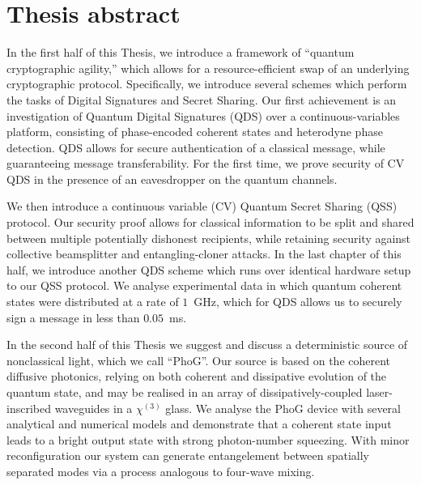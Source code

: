 \chapter*{\hfill Thesis abstract}

In the first half of this Thesis, we introduce a framework of ``quantum cryptographic agility,'' which allows for a resource-efficient swap of an underlying cryptographic protocol. Specifically, we introduce several schemes which perform the tasks of Digital Signatures and Secret Sharing. Our first achievement is an investigation of Quantum Digital Signatures (QDS) over a continuous-variables platform, consisting of phase-encoded coherent states and heterodyne phase detection. QDS allows for secure authentication of a classical message, while guaranteeing message transferability. For the first time, we prove security of CV QDS in the presence of an eavesdropper on the quantum channels. 

We then introduce a continuous variable (CV) Quantum Secret Sharing (QSS) protocol. Our security proof allows for classical information to be split and shared between multiple potentially dishonest recipients, while retaining security against collective beamsplitter and entangling-cloner attacks. In the last chapter of this half, we introduce another QDS scheme which runs over identical hardware setup to our QSS protocol. We analyse experimental data in which quantum coherent states were distributed at a rate of $1$~GHz, which for QDS allows us to securely sign a message in less than $0.05$~ms.

In the second half of this Thesis we suggest and discuss a deterministic source of nonclassical light, which we call ``PhoG''. Our source is based on the coherent diffusive photonics, relying on both coherent and dissipative evolution of the quantum state, and may be realised in an array of dissipatively-coupled laser-inscribed waveguides in a $\chi^{\left(3\right)}$ glass. We analyse the PhoG device with several analytical and numerical models and demonstrate that a coherent state input leads to a bright output state with strong photon-number squeezing. With minor reconfiguration our system can generate entangelement between spatially separated modes via a process analogous to four-wave mixing.